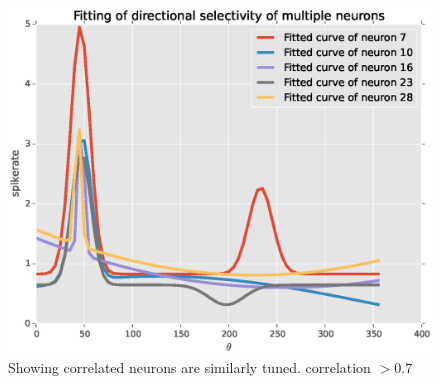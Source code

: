 \documentclass[11pt]{article}
\begin{document}
\begin{figure}[h]
    \centering
    \label{clusters}
    \includegraphics[width=.8\textwidth]{plots/corrTuned}
    \caption{Showing correlated neurons are similarly tuned. correlation $> 0.7$}
\end{figure}
\newpage

% 

\end{document}
